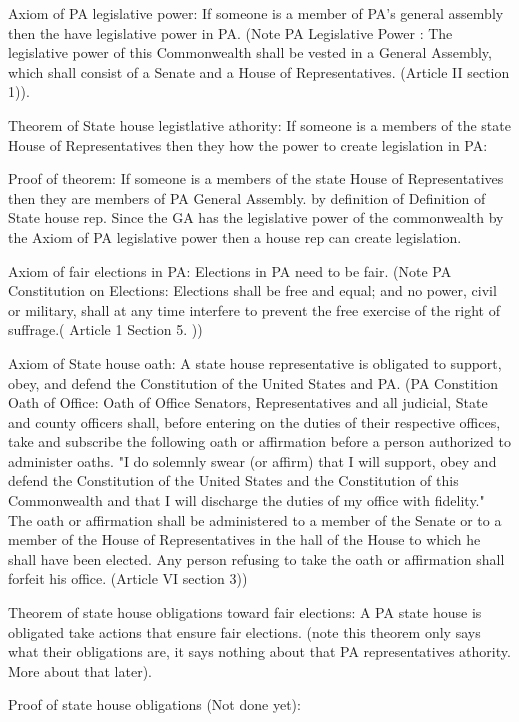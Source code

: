 \documentclass[11pt]{article} %
\begin{document}
\begin{enumerate}
Axiom of PA legislative power:  If someone is a member of PA's general assembly then the have legislative power in PA.  (Note PA Legislative Power : The legislative power of this Commonwealth shall be vested in a General Assembly, which shall consist of a Senate and a House of Representatives. (Article II section 1)).

Theorem of State house legistlative athority: If someone is a members of the state House of Representatives then they how the power to create legislation in PA: 

Proof of theorem:
If someone is a members of the state House of Representatives then they are members of PA General Assembly. by definition of Definition of State house rep.  Since the GA has the legislative power of the commonwealth by the Axiom of PA legislative power then a house rep can create legislation. 


Axiom of fair elections in PA: Elections in PA need to be fair. (Note PA Constitution on Elections: Elections shall be free and equal; and no power, civil or military, shall at any time interfere to prevent the free exercise of the right of suffrage.( Article 1 Section 5. ))

Axiom of State house oath: A state house representative is obligated to support, obey, and defend the  Constitution of the United States and PA. (PA Constition Oath of Office: Oath of Office  Senators, Representatives and all judicial, State and county officers shall, before entering on the duties of their respective offices, take and subscribe the following oath or affirmation before a person authorized to administer oaths. "I do solemnly swear (or affirm) that I will support, obey and defend the Constitution of the United States and the Constitution of this Commonwealth and that I will discharge the duties of my office with fidelity." The oath or affirmation shall be administered to a member of the Senate or to a member of the House of Representatives in the hall of the House to which he shall have been elected. Any person refusing to take the oath or affirmation shall forfeit his office. (Article VI section 3))

Theorem of state house obligations toward fair elections:  A PA state house is obligated take actions that ensure fair elections. (note this theorem only says what their obligations are, it says nothing about that PA representatives athority. More about that later).

Proof of state house obligations (Not done yet):


\end{enumerate}
\end{document}

